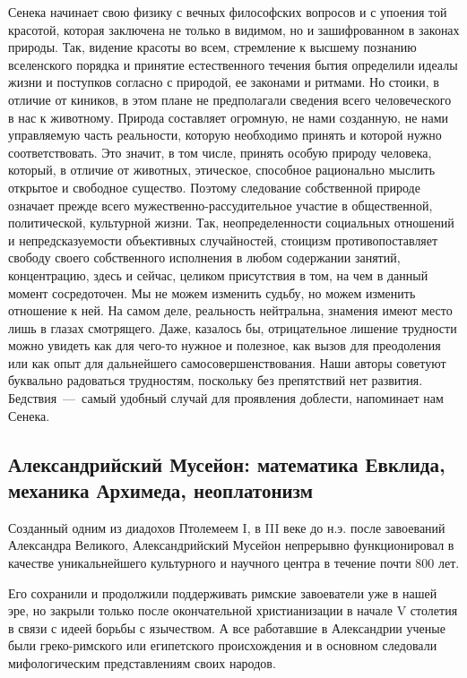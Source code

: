 Сенека начинает свою физику с вечных философских вопросов и с упоения той красотой, которая заключена не
только в видимом, но и зашифрованном в законах природы. Так, видение красоты во всем, стремление к высшему познанию вселенского порядка и принятие естественного течения бытия определили идеалы жизни и поступков согласно с природой, ее законами и ритмами. Но стоики, в отличие от киников, в этом плане не
предполагали сведения всего человеческого в нас к животному. Природа составляет
огромную, не нами созданную, не нами управляемую часть реальности, которую
необходимо принять и которой нужно соответствовать. Это значит, в том числе,
принять особую природу человека, который, в отличие от животных, этическое,
способное рационально мыслить открытое и свободное существо. Поэтому следование
собственной природе означает прежде всего мужественно-рассудительное участие в
общественной, политической, культурной жизни. Так, неопределенности социальных
отношений и непредсказуемости объективных случайностей, стоицизм
противопоставляет свободу своего собственного исполнения в любом содержании
занятий, концентрацию, здесь и сейчас, целиком присутствия в том, на чем в
данный момент сосредоточен. Мы не можем изменить судьбу, но можем изменить
отношение к ней. На самом деле, реальность нейтральна, знамения имеют место лишь в глазах смотрящего. Даже, казалось бы, отрицательное лишение трудности можно увидеть как для чего-то нужное и полезное, как вызов для преодоления или как опыт для дальнейшего самосовершенствования. Наши авторы советуют буквально радоваться трудностям, поскольку без препятствий нет развития. Бедствия~---~самый удобный случай для проявления доблести, напоминает нам Сенека.

\subsection{Александрийский Мусейон: математика Евклида, механика Архимеда, неоплатонизм}

Созданный одним из диадохов Птолемеем I, в III веке до н.э. после
завоеваний Александра Великого, Александрийский Мусейон непрерывно функционировал в качестве уникальнейшего культурного и научного центра в течение почти 800 лет.

Его сохранили и продолжили поддерживать римские завоеватели уже в нашей эре, но закрыли только после окончательной христианизации в начале V столетия в связи с идеей борьбы с язычеством. А все работавшие в Александрии ученые были греко-римского или египетского происхождения и в основном следовали мифологическим представлениям своих народов. 

